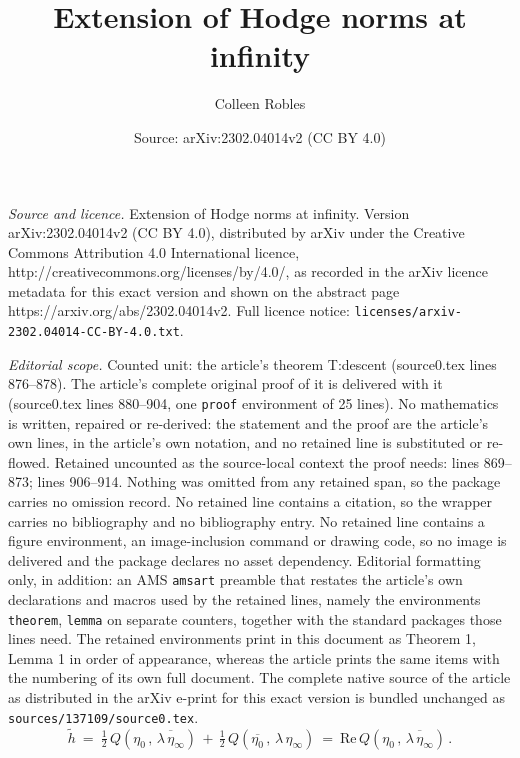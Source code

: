 \documentclass[10pt,a4paper]{amsart}
\title{Extension of Hodge norms at infinity}
\author{Colleen Robles}
\date{Source: arXiv:2302.04014v2 (CC BY 4.0)}
\def\half{\tfrac{1}{2}}
\def\tRe{\mathrm{Re}} \def\tRic{\mathrm{Ric}}
\begin{document}
\maketitle

\noindent\emph{Source and licence.} Extension of Hodge norms at infinity. Version arXiv:2302.04014v2 (CC BY 4.0), distributed by arXiv under the Creative Commons Attribution 4.0 International licence, http://creativecommons.org/licenses/by/4.0/, as recorded in the arXiv licence metadata for this exact version and shown on the abstract page https://arxiv.org/abs/2302.04014v2. Full licence notice: \texttt{licenses/arxiv-2302.04014-CC-BY-4.0.txt}.\par\smallskip

\noindent\textit{Editorial scope.} Counted unit: the article's theorem T:descent (source0.tex lines 876--878). The article's complete original proof of it is delivered with it (source0.tex lines 880--904, one \texttt{proof} environment of 25 lines). No mathematics is written, repaired or re-derived: the statement and the proof are the article's own lines, in the article's own notation, and no retained line is substituted or re-flowed.  Retained uncounted as the source-local context the proof needs: lines 869--873; lines 906--914.  Nothing was omitted from any retained span, so the package carries no omission record.  No retained line contains a citation, so the wrapper carries no bibliography and no bibliography entry.  No retained line contains a figure environment, an image-inclusion command or drawing code, so no image is delivered and the package declares no asset dependency.  Editorial formatting only, in addition: an AMS \texttt{amsart} preamble that restates the article's own declarations and macros used by the retained lines, namely the environments \texttt{theorem}, \texttt{lemma} on separate counters, together with the standard packages those lines need.  The retained environments print in this document as Theorem 1, Lemma 1 in order of appearance, whereas the article prints the same items with the numbering of its own full document.  The complete native source of the article as distributed in the arXiv e-print for this exact version is bundled unchanged as \texttt{sources/137109/source0.tex}.
\begin{equation}\label{E:tildeh}
  \tilde h \ = \ \half\,Q(\eta_0 \,,\,\overline{\lambda\,\eta_\infty})
  \,+\, \half\,Q(\overline{\eta_0} \,,\,\lambda\,\eta_\infty) 
  \ = \ \tRe\,Q(\eta_0 \,,\,\overline{\lambda\,\eta_\infty}) \,.
\end{equation}
\end{document}
